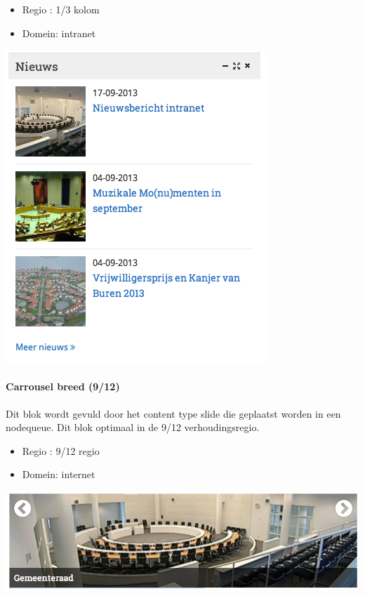 \begin{itemize}
\item Regio : 1/3 kolom
\item Domein: intranet
\end{itemize}

\begin{center}
	\includegraphics[scale=0.5]{img/blokken/nieuwsteaserimg.png}
\end{center}

\paragraph{Carrousel breed (9/12)}

Dit blok wordt gevuld door het content type slide die geplaatst worden in een nodequeue. Dit blok optimaal in de 9/12 verhoudingsregio.

\begin{itemize}
\item Regio : 9/12 regio
\item Domein: internet
\end{itemize}

\begin{center}
	\includegraphics[scale=0.5]{img/blokken/carrouselbreed.png}
\end{center}

